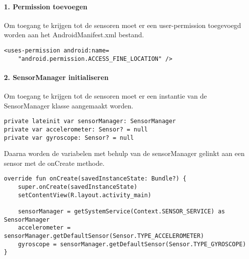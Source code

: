 \paragraph{1. Permission toevoegen}
Om toegang te krijgen tot de sensoren moet er een user-permission toegevoegd worden aan het 
AndroidManifest.xml bestand.
\begin{verbatim}
<uses-permission android:name=
    "android.permission.ACCESS_FINE_LOCATION" />
\end{verbatim}

\paragraph{2. SensorManager initialiseren}
Om toegang te krijgen tot de sensoren moet er een instantie van de SensorManager klasse aangemaakt worden.
\begin{verbatim}
private lateinit var sensorManager: SensorManager
private var accelerometer: Sensor? = null
private var gyroscope: Sensor? = null
\end{verbatim}
Daarna worden de variabelen met behulp van de sensorManager gelinkt aan een sensor met de onCreate methode.
\begin{verbatim}
override fun onCreate(savedInstanceState: Bundle?) {
    super.onCreate(savedInstanceState)
    setContentView(R.layout.activity_main)

    sensorManager = getSystemService(Context.SENSOR_SERVICE) as SensorManager
    accelerometer = sensorManager.getDefaultSensor(Sensor.TYPE_ACCELEROMETER)
    gyroscope = sensorManager.getDefaultSensor(Sensor.TYPE_GYROSCOPE)
}
\end{verbatim}

